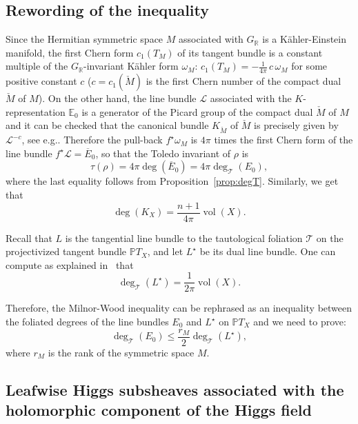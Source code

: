 \documentclass[10pt]{amsart}
\let\mathcal\mathscr
\newcommand{\citestar}[3]{\cite[#3]{#1}}
\theoremstyle{plain}
\theoremstyle{definition}
\let\cst c
\let\ov\overline
\DeclareMathOperator{\vol}{vol}
\newcommand{\cL}{\mathcal{L}}
\newcommand{\cT}{\mathcal{T}}
\newcommand{\bE}{\mathbb{E}}
\newcommand{\bR}{\mathbb{R}}
\newcommand{\PTX}{{\mathbb{P}T_X}}
\newcommand{\rkm}{{r_M}}
\newcommand{\ovE}{\ov{E}}
\providecommand{\eg}{e.g.}\providecommand{\ie}{i.e.}\providecommand{\etc}{etc.}\providecommand{\resp}{resp.}\providecommand{\cf}{cf.}
\begin{document}
\subsection{Rewording of the inequality}\label{subsec:reword}

Since the Hermitian symmetric space $M$ asso\-ciated with
$G_\bR$ is a Kähler-Einstein manifold, the first Chern
form $c_1(T_M)$ of its tangent bundle is a constant multiple of the $G_\bR$-invariant Kähler form $\omega_M$:
$c_1(T_M)=- \frac 1{4\pi}\,\cst \,\omega_M$ for some positive constant $\cst$ ($\cst=c_1(\check{M})$ is the first
Chern number of the compact dual $\check{M}$ of $M$). On the other hand, the line bundle $\cL$
associated with the $K$-representation $\bE_0$ is
a generator of the Picard group of the compact dual $\check{M}$ of $M$ and it can be checked that the
canonical bundle
$K_{\check{M}}$ of $\check{M}$ is precisely given by ${\cL}^{-\cst}$, see
\eg \citestar{KMgeneraltype}*{}.
Therefore the pull-back
$f^\star\omega_M$ is $4\pi$ times the first Chern form of the line bundle $f^\star\cL=\ovE_0$, so
that the Toledo invariant of $\rho$ is
\begin{equation}
\label{equa:toledo}
\tau(\rho)=4\pi\deg (\ovE_0)=4\pi\deg_\cT(E_0),
\end{equation}
where the last equality
follows from Proposition~\ref{prop:degT}. Similarly, we get that
\begin{equation}
\label{equa:deg-canonique}
\deg(K_X)=\frac{n+1}{4\pi}\vol (X).
\end{equation}

Recall that $L$ is the tangential line bundle to the tautological foliation $\cT$ on
the projectivized tangent bundle $\PTX$, and let $L^\star$ be its dual line bundle. One can compute
as explained in~\citestar{KM}*{.1} that
\begin{equation}
\label{equa:deg-L}
\deg_\cT(L^\star) = \frac{1}{2\pi} \vol(X).
\end{equation}

Therefore, the Milnor-Wood inequality can be rephrased as an inequality between the foliated degrees
of the line bundles $E_0$ and $L^\star$ on $\PTX$ and we need to prove:
\begin{equation}
\label{equa:rewording}
\deg_\cT(E_0) \leq \frac \rkm{2} \deg_\cT(L^\star),
\end{equation}
where $\rkm$ is the rank of the symmetric space $M$.

\subsection{Leafwise Higgs subsheaves associated with the holomorphic component of the Higgs field}
\label{subsec:HiggsSubsheaf}
\end{document}
